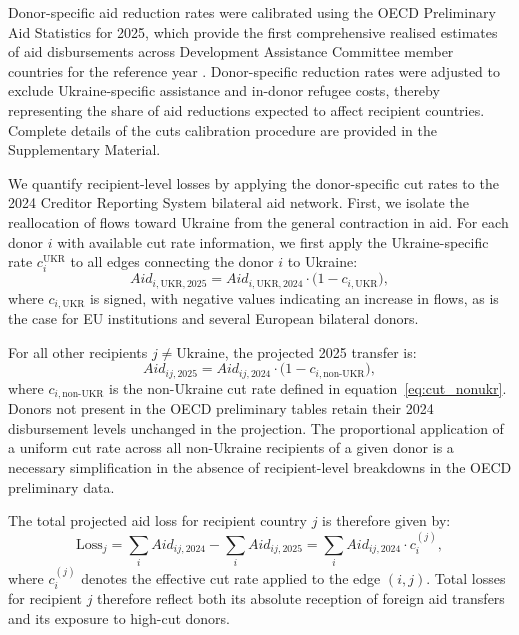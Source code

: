 \documentclass[fleqn,10pt,twocolumn]{wlscirep}
\begin{document}
Donor-specific aid reduction rates were calibrated using the OECD Preliminary Aid Statistics for 2025, which provide the first comprehensive realised estimates of aid disbursements across Development Assistance Committee member countries for the reference year \cite{OECD2026}. Donor-specific reduction rates were adjusted to exclude Ukraine-specific assistance and in-donor refugee costs, thereby representing the share of aid reductions expected to affect recipient countries. Complete details of the cuts calibration procedure are provided in the Supplementary Material.

We quantify recipient-level losses by applying the donor-specific cut rates to the 2024 Creditor Reporting System bilateral aid network. First, we isolate the reallocation of flows toward Ukraine from the general contraction in aid. For each donor $i$ with available cut rate information, we first apply the Ukraine-specific rate $c_i^{\text{UKR}}$ to all edges connecting the donor $i$ to Ukraine:
\begin{equation}
    {Aid}_{i,\text{UKR},2025} = {Aid}_{i,\text{UKR},2024}
        \cdot \bigl(1 - c_{i,\text{UKR}}\bigr),
    \label{eq:ukr_proj}
\end{equation}
where $c_{i,\text{UKR}}$ is signed, with negative values indicating an increase in flows, as is the case for EU institutions and several European bilateral donors.

For all other recipients $j \neq \text{Ukraine}$, the projected 2025 transfer is:
\begin{equation}
    {Aid}_{ij,2025} = {Aid}_{ij,2024}
        \cdot \bigl(1 - c_{i,\text{non-UKR}}\bigr),
    \label{eq:proj_general}
\end{equation}
where $c_{i,\text{non-UKR}}$ is the non-Ukraine cut rate defined in equation~\eqref{eq:cut_nonukr}. Donors not present in the OECD preliminary tables retain their 2024 disbursement levels unchanged in the projection. The proportional application of a uniform cut rate across all non-Ukraine recipients of a given donor is a necessary simplification in the absence of recipient-level breakdowns in the OECD preliminary data.

The total projected aid loss for recipient country $j$ is therefore given by:
\begin{equation}
    \text{Loss}_j = \sum_{i} {Aid}_{ij,2024} - \sum_{i} {Aid}_{ij,2025}
             = \sum_{i} {Aid}_{ij,2024} \cdot c_i^{(j)},
    \label{eq:total_loss}
\end{equation}
where $c_i^{(j)}$ denotes the effective cut rate applied to the edge $(i, j)$. Total losses for recipient $j$ therefore reflect both its absolute reception of foreign aid transfers and its exposure to high-cut donors.
\end{document}
